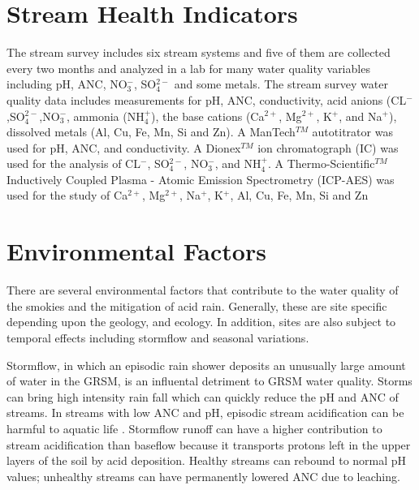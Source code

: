 \section{Stream Health Indicators}
The stream survey includes six stream systems and five of them are collected every two months and analyzed in a lab for many water quality variables including pH, ANC, NO$_3^-$, SO$_4^{2-}$ and some metals.  %
The stream survey water quality data includes measurements for pH, ANC, conductivity, acid anions (CL$^-$,SO$_4^{2-}$,NO$_3^-$, ammonia (NH$_4^+$), the base cations (Ca$^{2+}$, Mg$^{2+}$, K$^+$, and Na$^+$), dissolved metals (Al, Cu, Fe, Mn, Si and Zn).  
A ManTech$^{TM}$ autotitrator was used for pH, ANC, and conductivity.  
A Dionex$^{TM}$ ion chromatograph (IC) was used for the analysis of CL$^-$, SO$_4^{2-}$, NO$_3^-$, and NH$_4^+$.  A Thermo-Scientific$^{TM}$ Inductively Coupled Plasma - Atomic Emission Spectrometry (ICP-AES) was used for the study of Ca$^{2+}$, Mg$^{2+}$, Na$^+$, K$^+$, Al, Cu, Fe, Mn, Si and Zn

\section{Environmental Factors} %
\label{sec:IntroEnvFactors}
There are several environmental factors that contribute to the water quality of the smokies and the mitigation of acid rain.
Generally, these are site specific depending upon the geology, and ecology.
In addition, sites are also subject to temporal effects including stormflow and seasonal variations.

Stormflow, in which an episodic rain shower deposits an unusually large amount of water in the GRSM, is an influental detriment to GRSM water quality. 
Storms can bring high intensity rain fall which can quickly reduce the pH and ANC of streams. 
In streams with low ANC and pH, episodic stream acidification can be harmful to aquatic life \citep{neff2009physiological}. 
Stormflow runoff can have a higher contribution to stream acidification than baseflow because it transports protons left in the upper layers of the soil by acid deposition. 
Healthy streams can rebound to normal pH values; unhealthy streams can have permanently lowered ANC due to leaching.  

